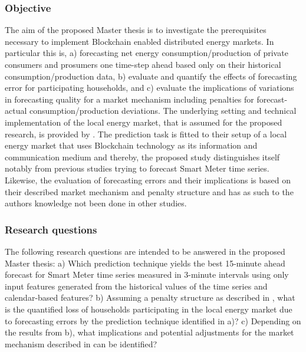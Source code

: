 \subsubsection{Objective}
The aim of the proposed Master thesis is to investigate the prerequisites necessary to implement Blockchain enabled distributed energy markets. In particular this is,
a)	forecasting net energy consumption/production of private consumers and prosumers one time-step ahead based only on their historical consumption/production data,
b)	evaluate and quantify the effects of forecasting error for participating households, and
c)	evaluate the implications of variations in forecasting quality for a market mechanism including penalties for forecast-actual consumption/production deviations.
The underlying setting and technical implementation of the local energy market, that is assumed for the proposed research, is provided by \citet{Mengelkamp:2018a}. The prediction task is fitted to their setup of a local energy market that uses Blockchain technology as its information and communication medium and thereby, the proposed study distinguishes itself notably from previous studies trying to forecast Smart Meter time series. Likewise, the evaluation of forecasting errors and their implications is based on their described market mechanism and penalty structure and has as such to the authors knowledge not been done in other studies.


\subsubsection{Research questions}
The following research questions are intended to be answered in the proposed Master thesis:
a)	Which prediction technique yields the best 15-minute ahead forecast  for Smart Meter time series measured in 3-minute intervals using only input features generated from the historical values of the time series and calendar-based features?
b)	Assuming a penalty structure as described in \citet{Mengelkamp:2018a}, what is the quantified loss of households participating in the local energy market due to forecasting errors by the prediction technique identified in a)?
c)	Depending on the results from b), what implications and potential adjustments for the market mechanism described in \citet{Mengelkamp:2018a} can be identified?




